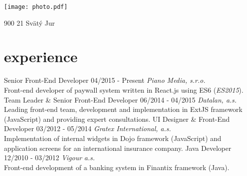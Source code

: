 \documentclass[a4paper]{cv}
\begin{document}


\begin{aside}
	\texttt{[image: photo.pdf]}
	\address{Pannónska 9}{900 21 Svätý Jur}
	\section{\vspace{5mm}         }
\end{aside}

\section{experience}
\begin{entrylist}
	\entry
		{Senior Front-End Developer}
		{04/2015 - Present}
		{\emph{Piano Media, s.r.o.}\\
		Front-end developer of paywall system written in React.js using ES6 ({\emph{ES2015}}).}
	\entry
		{Team Leader \& Senior Front-End Developer}
		{06/2014 - 04/2015}
		{\emph{Datalan, a.s.}\\
		Leading front-end team, development and implementation in ExtJS framework (JavaScript) and providing expert consultations.}
	\entry
		{UI Designer \& Front-End Developer}
		{03/2012 - 05/2014}
		{\emph{Gratex International, a.s.}\\
		Implementation of internal widgets in Dojo framework (JavaScript) and application screens for an international insurance company.}
	\entry
		{Java Developer}
		{12/2010 - 03/2012}
		{\emph{Vigour a.s.}\\
		Front-end development of a banking system in Finantix framework (Java).}
\end{entrylist}
\end{document}
